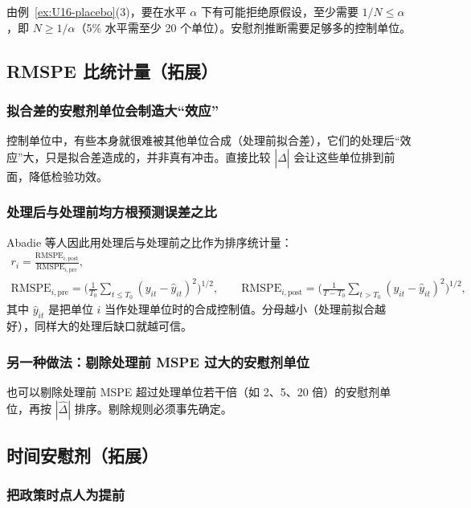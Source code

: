 由例~\ref{ex:U16-placebo}(3)，要在水平 $\alpha$ 下有可能拒绝原假设，至少需要 $1/N\le\alpha$，即 $N\ge1/\alpha$（5\% 水平需至少 20 个单位）。安慰剂推断需要足够多的控制单位。

\subsection{RMSPE 比统计量（拓展）}

\subsubsection{拟合差的安慰剂单位会制造大“效应”}

控制单位中，有些本身就很难被其他单位合成（处理前拟合差），它们的处理后“效应”大，只是拟合差造成的，并非真有冲击。直接比较 $|\hat\Delta|$ 会让这些单位排到前面，降低检验功效。

\subsubsection{处理后与处理前均方根预测误差之比}

Abadie 等人因此用处理后与处理前之比作为排序统计量：
\begin{gather*}
r_i=\frac{\mathrm{RMSPE}_{i,\mathrm{post}}}{\mathrm{RMSPE}_{i,\mathrm{pre}}},\\
\mathrm{RMSPE}_{i,\mathrm{pre}}=\Big(\frac{1}{T_0}\sum_{t\le T_0}(y_{it}-\hat y_{it})^2\Big)^{1/2},\qquad
\mathrm{RMSPE}_{i,\mathrm{post}}=\Big(\frac{1}{T-T_0}\sum_{t>T_0}(y_{it}-\hat y_{it})^2\Big)^{1/2},
\end{gather*}
其中 $\hat y_{it}$ 是把单位 $i$ 当作处理单位时的合成控制值。分母越小（处理前拟合越好），同样大的处理后缺口就越可信。

\subsubsection{另一种做法：剔除处理前 MSPE 过大的安慰剂单位}

也可以剔除处理前 MSPE 超过处理单位若干倍（如 2、5、20 倍）的安慰剂单位，再按 $|\hat\Delta|$ 排序。剔除规则必须事先确定。

\subsection{时间安慰剂（拓展）}

\subsubsection{把政策时点人为提前}


